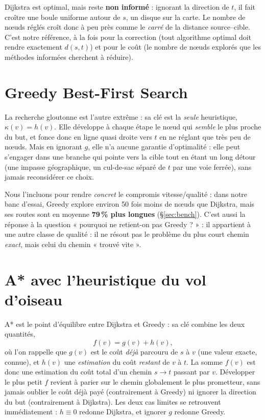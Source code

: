 \medskip

Dijkstra est optimal, mais reste \textbf{non informé} : ignorant la direction de
$t$, il fait croître une boule uniforme autour de $s$, un disque sur la carte.
Le nombre de nœuds réglés croît donc à peu près comme le \emph{carré} de la
distance source--cible. C'est notre référence, à la fois pour la correction (tout
algorithme optimal doit rendre exactement $d(s,t)$) et pour le coût (le nombre de
nœuds explorés que les méthodes informées cherchent à réduire).

\section{Greedy Best-First Search}
\label{sec:greedy}

La recherche gloutonne \citep{russell2010aima} est l'autre extrême : sa clé est
la \emph{seule} heuristique, $\kappa(v) = h(v)$. Elle développe à chaque étape le
nœud qui \emph{semble} le plus proche du but, et fonce donc en ligne quasi droite
vers $t$ en ne réglant que très peu de nœuds. Mais en ignorant $g$, elle n'a
aucune garantie d'optimalité : elle peut s'engager dans une branche qui pointe
vers la cible tout en étant un long détour (une impasse géographique, un
cul-de-sac séparé de $t$ par une voie ferrée), sans jamais reconsidérer ce choix.

\medskip

Nous l'incluons pour rendre \emph{concret} le compromis vitesse/qualité : dans
notre banc d'essai, Greedy explore environ 50 fois moins de nœuds que Dijkstra,
mais ses routes sont en moyenne \textbf{79\,\% plus longues}
(\S\ref{sec:bench}). C'est aussi la réponse à la question « pourquoi ne
retient-on pas Greedy ? » : il appartient à une autre classe de qualité : il ne
résout pas le problème du plus court chemin \emph{exact}, mais celui du chemin
« trouvé vite ».

\section{A* avec l'heuristique du vol d'oiseau}
\label{sec:astar}

A* \citep{hart1968astar} est le point d'équilibre entre Dijkstra et Greedy : sa
clé combine les deux quantités,
\[
  f(v) = g(v) + h(v),
\]
où l'on rappelle que $g(v)$ est le coût \emph{déjà} parcouru de $s$ à $v$ (une
valeur exacte, connue), et $h(v)$ une \emph{estimation} du coût \emph{restant} de
$v$ à $t$. La somme $f(v)$ est donc une estimation du coût total d'un chemin
$s \to t$ passant par $v$. Développer le plus petit $f$ revient à parier sur le
chemin globalement le plus prometteur, sans jamais oublier le coût déjà payé
(contrairement à Greedy) ni ignorer la direction du but (contrairement à
Dijkstra). Les deux cas limites se retrouvent immédiatement : $h \equiv 0$ redonne
Dijkstra, et ignorer $g$ redonne Greedy.

